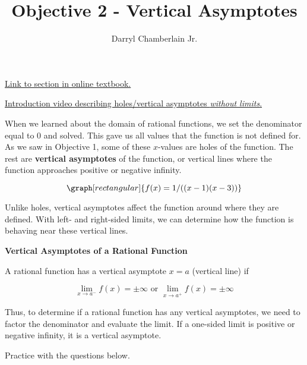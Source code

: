 \documentclass{ximera}
\author{Darryl Chamberlain Jr.}
\title{Objective 2 - Vertical Asymptotes}
\begin{document}
\begin{abstract}

\end{abstract}
\maketitle
 
\href{https://cnx.org/contents/mwjClAV_@8.21:KNTP2r7D@14/Rational-Functions}{Link to section in online textbook.}

\href{https://mediasite.video.ufl.edu/Mediasite/Play/7c895945aa40406e93f9a39e2aa343561d}{Introduction video describing holes/vertical asymptotes \textit{without limits}.}
 

When we learned about the domain of rational functions, we set the denominator equal to 0 and solved. This gave us all values that the function is not defined for. As we saw in Objective 1, some of these $x$-values are holes of the function. The rest are \textbf{vertical asymptotes} of the function, or vertical lines where the function approaches positive or negative infinity. 

\[
\graph[rectangular]{f(x) = 1/((x-1)(x-3))}
\]

Unlike holes, vertical asymptotes affect the function around where they are defined. With left- and right-sided limits, we can determine how the function is behaving near these vertical lines. 

\begin{theorem}
\textbf{Vertical Asymptotes of a Rational Function}

A rational function has a vertical asymptote $x = a$ (vertical line) if 

$$\lim_{x \rightarrow a^{-}} f(x) = \pm \infty \text{ or } \lim_{x \rightarrow a^{+}} f(x) = \pm \infty $$ 

Thus, to determine if a rational function has any vertical asymptotes, we need to factor the denominator and evaluate the limit. If a one-sided limit is positive or negative infinity, it is a vertical asymptote. 
\end{theorem}

Practice with the questions below. 
\end{document}
